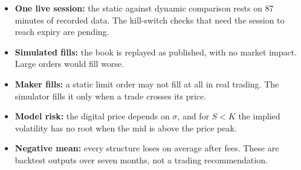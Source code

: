 \documentclass[11pt,a4paper]{article}
\begin{document}
\begin{itemize}
\item \textbf{One live session:} the static against dynamic comparison rests on 87 minutes of recorded data. The kill-switch checks that need the session to reach expiry are pending.
\item \textbf{Simulated fills:} the book is replayed as published, with no market impact. Large orders would fill worse.
\item \textbf{Maker fills:} a static limit order may not fill at all in real trading. The simulator fills it only when a trade crosses its price.
\item \textbf{Model risk:} the digital price depends on $\sigma$, and for $S<K$ the implied volatility has no root when the mid is above the price peak.
\item \textbf{Negative mean:} every structure loses on average after fees. These are backtest outputs over seven months, not a trading recommendation.
\end{itemize}
\end{document}
